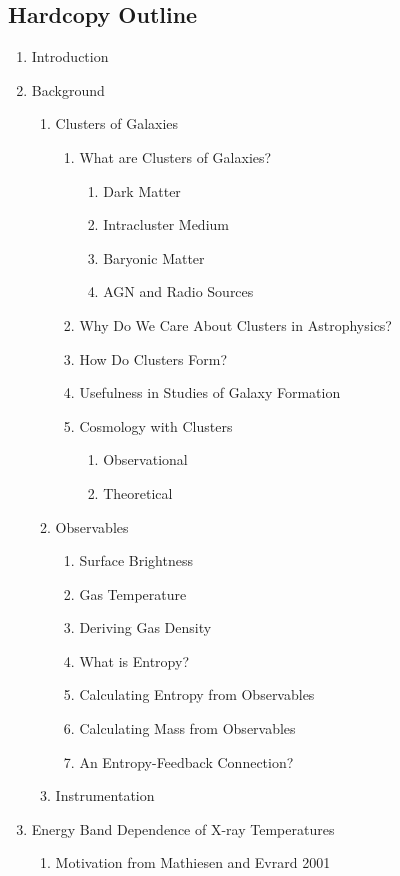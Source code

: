\documentclass[12pt]{plan}
\begin{document}
\subsection*{Hardcopy Outline}
\begin{enumerate}
\item Introduction
\item Background
\begin{enumerate}
\item Clusters of Galaxies
\begin{enumerate}
\item What are Clusters of Galaxies?
\begin{enumerate}
\item Dark Matter
\item Intracluster Medium
\item Baryonic Matter
\item AGN and Radio Sources
\end{enumerate}
\item Why Do We Care About Clusters in Astrophysics?
\item How Do Clusters Form?
\item Usefulness in Studies of Galaxy Formation
\item Cosmology with Clusters
\begin{enumerate}
\item Observational
\item Theoretical
\end{enumerate}
\end{enumerate}
\item Observables
\begin{enumerate}
\item Surface Brightness
\item Gas Temperature
\item Deriving Gas Density
\item What is Entropy?
\item Calculating Entropy from Observables
\item Calculating Mass from Observables
\item An Entropy-Feedback Connection?
\end{enumerate}
\item Instrumentation
\end{enumerate}
\item Energy Band Dependence of X-ray Temperatures
\begin{enumerate}
\item Motivation from Mathiesen and Evrard 2001

\end{enumerate}
\end{enumerate}
\end{document}
